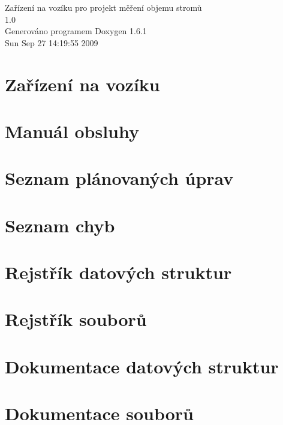 \documentclass[a4paper]{book}
\begin{document}
\begin{titlepage}
\vspace*{7cm}
\begin{center}
{\Large Zařízení na vozíku pro projekt měření objemu stromů \\[1ex]\large 1.0 }\\
\vspace*{1cm}
{\large Generováno programem Doxygen 1.6.1}\\
\vspace*{0.5cm}
{\small Sun Sep 27 14:19:55 2009}\\
\end{center}
\end{titlepage}
\clearemptydoublepage
{}
\tableofcontents
\clearemptydoublepage
{}
\chapter{Zařízení na vozíku}
\label{index}
\chapter{Manuál obsluhy}
\label{Manual}

\chapter{Seznam plánovaných úprav}
\label{todo}

\chapter{Seznam chyb}
\label{bug}

\chapter{Rejstřík datových struktur}

\chapter{Rejstřík souborů}

\chapter{Dokumentace datových struktur}

\chapter{Dokumentace souborů}


































\printindex
\end{document}
